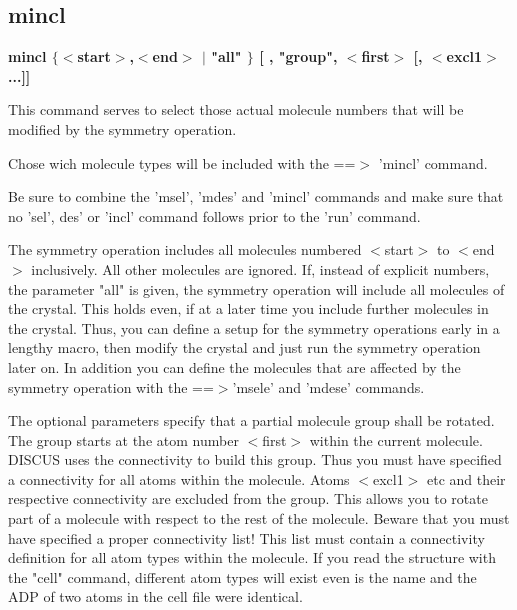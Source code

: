 \subsection*{mincl}
{\bf mincl $ \{$$ <$start$> $,$ <$end$> $ $| $ "all" $\} $ [ , "group", $ <$first$> $ [, $ <$excl1$> $...]] \par }
\par
\vspace{3pt}
This command serves to select those actual molecule numbers 
that will be modified by the symmetry operation. 
\par
Chose wich molecule types will be included with the 
==$> $ 'mincl' command. 
\par
Be sure to combine the 'msel', 'mdes' and 'mincl' commands and 
make sure that no 'sel', des' or 'incl' command follows 
prior to the 'run' command. 
\par
The symmetry operation includes all molecules numbered $ <$start$> $ to $ <$end$> $ 
inclusively. All other molecules are ignored. 
If, instead of explicit numbers, the parameter "all" is given, the 
symmetry operation will include all molecules of the crystal. This holds 
even, if at a later time you include further molecules in the crystal. 
Thus, you can define a setup for the symmetry operations early in a 
lengthy macro, then modify the crystal and just run the symmetry 
operation later on. 
In addition you can define the molecules that are affected by the 
symmetry operation with the ==$> $'msele' and 'mdese' commands. 
\par
The optional parameters specify that a partial molecule group 
shall be rotated. The group starts at the atom number $ <$first$> $ 
within the current molecule. DISCUS uses the connectivity to 
build this group. Thus you must have specified a connectivity 
for all atoms within the molecule. Atoms $ <$excl1$> $ etc and their 
respective connectivity are excluded from the group. 
This allows you to rotate part of a molecule with respect to 
the rest of the molecule. 
Beware that you must have specified a proper connectivity list! 
This list must contain a connectivity definition for all atom 
types within the molecule. If you read the structure with the 
"cell" command, different atom types will exist even is the 
name and the ADP of two atoms in the cell file were identical. 
\par

